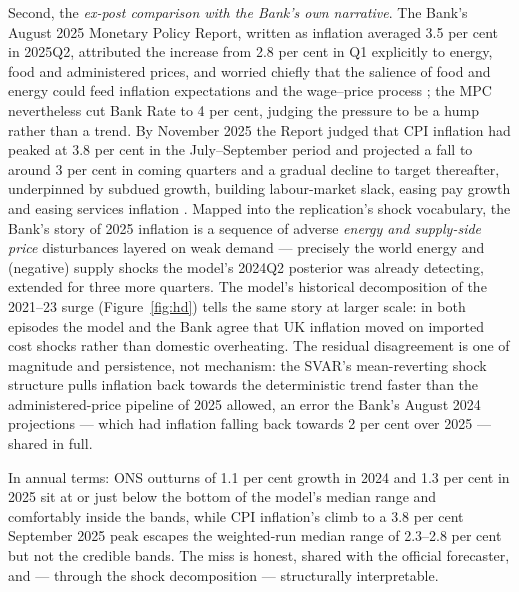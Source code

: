 Second, the \emph{ex-post comparison with the Bank's own narrative}. The Bank's August 2025 Monetary Policy Report, written as inflation averaged 3.5 per cent in 2025Q2, attributed the increase from 2.8 per cent in Q1 explicitly to energy, food and administered prices, and worried chiefly that the salience of food and energy could feed inflation expectations and the wage--price process \citep{boe2025mpr_aug}; the MPC nevertheless cut Bank Rate to 4 per cent, judging the pressure to be a hump rather than a trend. By November 2025 the Report judged that CPI inflation had peaked at 3.8 per cent in the July--September period and projected a fall to around 3 per cent in coming quarters and a gradual decline to target thereafter, underpinned by subdued growth, building labour-market slack, easing pay growth and easing services inflation \citep{boe2025mpr_nov}. Mapped into the replication's shock vocabulary, the Bank's story of 2025 inflation is a sequence of adverse \emph{energy and supply-side price} disturbances layered on weak demand --- precisely the world energy and (negative) supply shocks the model's 2024Q2 posterior was already detecting, extended for three more quarters. The model's historical decomposition of the 2021--23 surge (Figure~\ref{fig:hd}) tells the same story at larger scale: in both episodes the model and the Bank agree that UK inflation moved on imported cost shocks rather than domestic overheating. The residual disagreement is one of magnitude and persistence, not mechanism: the SVAR's mean-reverting shock structure pulls inflation back towards the deterministic trend faster than the administered-price pipeline of 2025 allowed, an error the Bank's August 2024 projections --- which had inflation falling back towards 2 per cent over 2025 \citep{boe2024mpr} --- shared in full.

In annual terms: ONS outturns of 1.1 per cent growth in 2024 and 1.3 per cent in 2025 sit at or just below the bottom of the model's median range and comfortably inside the bands, while CPI inflation's climb to a 3.8 per cent September 2025 peak escapes the weighted-run median range of 2.3--2.8 per cent but not the credible bands. The miss is honest, shared with the official forecaster, and --- through the shock decomposition --- structurally interpretable.
